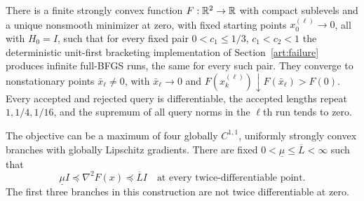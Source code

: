 \begin{theorem}
\label{art:local-failure-lower}
There is a finite strongly convex function $F:\mathbb R^2\to\mathbb R$ with compact
sublevels and a unique nonsmooth minimizer at zero, with fixed starting
points $x_0^{(\ell)}\to0$, all with $H_0=I$, such that for every fixed pair
$0<c_1\le1/3$, $c_1<c_2<1$ the deterministic unit-first bracketing
implementation of Section~\ref{art:failure} produces infinite
full-BFGS runs, the same for every such pair. They converge to nonstationary points $\bar x_\ell\ne0$,
with $\bar x_\ell\to0$ and
$F(x_k^{(\ell)})\downarrow F(\bar x_\ell)>F(0)$. Every accepted and rejected query
is differentiable, the accepted lengths repeat $1,1/4,1/16$, and the
supremum of all query norms in the $\ell$th run tends to zero.

The objective can be a maximum of four globally $C^{1,1}$, uniformly
strongly convex branches with globally Lipschitz gradients. There are
fixed $0<\underline\mu\le\overline L<\infty$ such that
\[
 \underline\mu I\preceq\nabla^2F(x)\preceq\overline L I
 \quad\text{at every twice-differentiable point}.
\]
The first three branches in this construction are not twice
differentiable at zero.
\end{theorem}

